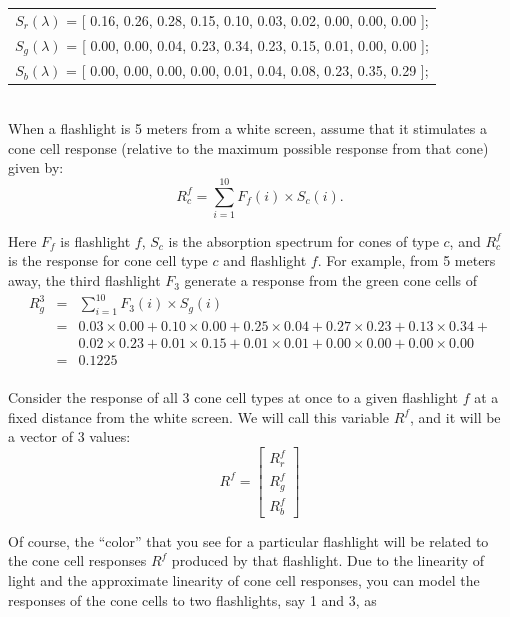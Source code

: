 \documentclass[10pt,letterpaper]{article}
\begin{document}
\begin{tabular}{c}
$S_r(\lambda)$ = [ 0.16, 0.26, 0.28, 0.15, 0.10, 0.03, 0.02, 0.00, 0.00, 0.00 ]; \\
$S_g(\lambda)$ = [ 0.00, 0.00, 0.04, 0.23, 0.34, 0.23, 0.15, 0.01, 0.00, 0.00 ];\\
$S_b(\lambda)$ = [ 0.00, 0.00, 0.00, 0.00, 0.01, 0.04, 0.08, 0.23, 0.35, 0.29 ];
\end{tabular}\\

When a flashlight is 5 meters from a white screen, assume that it stimulates
a cone cell response (relative to the maximum possible response from that cone)
given by: \\
\begin{equation*}
R^f_c = \sum_{i=1}^{10} F_f (i) \times S_c(i).
\end{equation*}

Here $F_f$ is flashlight $f$, $S_c$ is the absorption spectrum for cones of type $c$, and $R^f_c$ is the response for cone cell type $c$ and flashlight $f$. For example, from 5 meters away, the third flashlight $F_3$ generate a response from the green cone cells of\\
\begin{eqnarray*}
R^3_g &=& \sum_{i=1}^{10} F_3 (i) \times S_g(i) \\
&=& 0.03\times0.00 + 0.10\times0.00 + 0.25\times0.04 + 0.27\times0.23 + 0.13\times0.34 + \\ 
&~& 0.02\times0.23 + 0.01\times0.15 + 0.01\times0.01 + 0.00\times0.00 + 0.00\times0.00 \\
&=& 0.1225\\
\end{eqnarray*}

Consider the response of all 3 cone cell types at once to a given flashlight $f$
at a fixed distance from the white screen. We will call this variable $R^f$, and it will be a vector of 3 values:
\[
	R^f = \left[ \begin{array}{c}
				R^f_r \\
				R^f_g \\				
				R^f_b \end{array} \right]
\]

Of course, the “color” that you see for a particular flashlight will be related
to the cone cell responses $R^f$ produced by that flashlight. Due to the linearity
of light and the approximate linearity of cone cell responses, you can model the
responses of the cone cells to two flashlights, say 1 and 3, as
\end{document}
